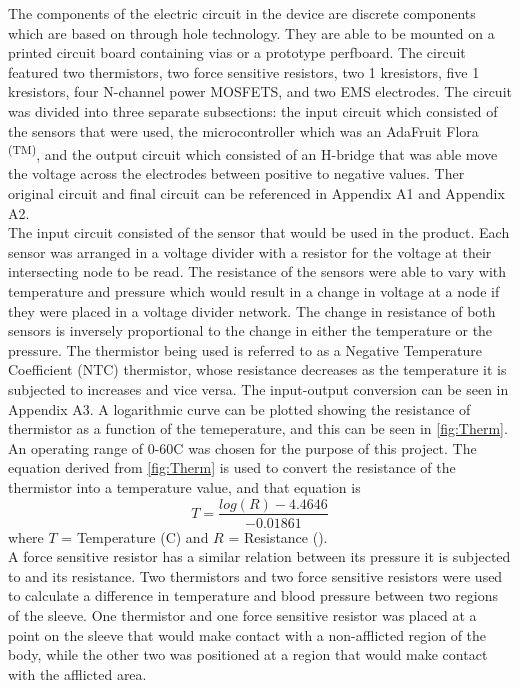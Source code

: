 \documentclass[11.5pt]{article}
\begin{document}
The components of the electric circuit in the device are discrete components which are based on through hole technology. They are able to be mounted on a printed circuit board containing vias or a prototype perfboard. The circuit featured two thermistors, two force sensitive resistors, two 1 k\ohm resistors, five 1 k\ohm resistors, four N-channel power MOSFETS, and two EMS electrodes. The circuit was divided into three separate subsections: the input circuit which consisted of the sensors that were used, the microcontroller which was an AdaFruit Flora \textsuperscript{(TM)}, and the output circuit which consisted of an H-bridge that was able move the voltage across the electrodes between positive to negative values. Ther original circuit and final circuit can be referenced in Appendix A1 and Appendix A2. \\

The input circuit consisted of the sensor that would be used in the product. Each sensor was arranged in a voltage divider with a resistor for the voltage at their intersecting node to be read. The resistance of the sensors were able to vary with temperature and pressure which would result in a change in voltage at a node if they were placed in a voltage divider network. The change in resistance of both sensors is inversely proportional to the change in either the temperature or the pressure. The thermistor being used is referred to as a Negative Temperature Coefficient (NTC) thermistor, whose resistance decreases as the temperature it is subjected to increases and vice versa. The input-output conversion can be seen in Appendix A3. A logarithmic curve can be plotted showing the resistance of thermistor as a function of the temeperature, and this can be seen in \ref{fig:Therm}. An operating range of 0-60\degree C was chosen for the purpose of this project. The equation derived from \ref{fig:Therm} is used to convert the resistance of the thermistor into a temperature value, and that equation is 
\begin{equation}
T = \frac{log(R)-4.4646}{-0.01861}
\end{equation}
where $T$ = Temperature (\degree C) and $R$ = Resistance (\ohm).\\

A force sensitive resistor has a similar relation between its pressure it is subjected to and its resistance. Two thermistors and two force sensitive resistors were used to calculate a difference in temperature and blood pressure between two regions of the sleeve. One thermistor and one force sensitive resistor was placed at a point on the sleeve that would make contact with a non-afflicted region of the body, while the other two was positioned at a region that would make contact with the afflicted area.\\
\end{document}
